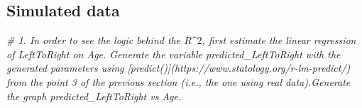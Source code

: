 \documentclass[
]{book}
\newenvironment{Shaded}{\begin{snugshade}}{\end{snugshade}}
\newcommand{\CommentTok}[1]{\textcolor[rgb]{0.56,0.35,0.01}{\textit{#1}}}
\begin{document}
\hypertarget{simulated-data-3}{%
\subsection{Simulated data}\label{simulated-data-3}}

\begin{Shaded}
\begin{Highlighting}[]
\CommentTok{\# 1. In order to see the logic behind the $R\^{}2$, first estimate the linear regression of \textasciigrave{}LeftToRight\textasciigrave{} on \textasciigrave{}Age\textasciigrave{}. Generate the variable \textasciigrave{}predicted\_LeftToRight\textasciigrave{} with the generated parameters using [\textasciigrave{}predict()\textasciigrave{}](https://www.statology.org/r{-}lm{-}predict/) from the point 3 of the previous section (i.e., the one using real data).Generate the graph \textasciigrave{}predicted\_LeftToRight\textasciigrave{} vs \textasciigrave{}Age\textasciigrave{}.}


\end{Highlighting}
\end{Shaded}
\end{document}
